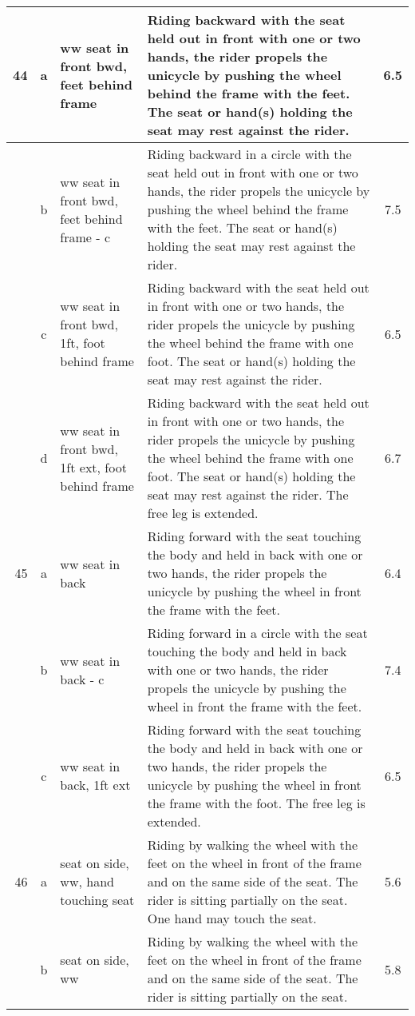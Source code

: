 \begin{longtable}{|r|c|p{4cm}|p{8cm}|c|}
\hline
44  & a & ww seat in front bwd, feet behind frame & Riding backward with the seat held out in front with one or two hands, the rider propels the unicycle by pushing the wheel behind the frame with the feet. The seat or hand(s) holding the seat may rest against the rider. & 6.5 \\ 
\hline
  & b & ww seat in front bwd, feet behind frame - c & Riding backward in a circle with the seat held out in front with one or two hands, the rider propels the unicycle by pushing the wheel behind the frame with the feet. The seat or hand(s) holding the seat may rest against the rider. & 7.5 \\ 
\hline
  & c & ww seat in front bwd, 1ft, foot behind frame  & Riding backward with the seat held out in front with one or two hands, the rider propels the unicycle by pushing the wheel behind the frame with one foot. The seat or hand(s) holding the seat may rest against the rider. & 6.5 \\ 
\hline
  & d & ww seat in front bwd, 1ft ext, foot behind frame  & Riding backward with the seat held out in front with one or two hands, the rider propels the unicycle by pushing the wheel behind the frame with one foot. The seat or hand(s) holding the seat may rest against the rider. The free leg is extended. & 6.7 \\ 
\hline
45  & a & ww seat in back & Riding forward with the seat touching the body and held in back with one or two hands, the rider propels the unicycle by pushing the wheel in front the frame with the feet.  & 6.4 \\ 
\hline
  & b & ww seat in back - c & Riding forward in a circle with the seat touching the body and held in back with one or two hands, the rider propels the unicycle by pushing the wheel in front the frame with the feet.  & 7.4 \\ 
\hline
  & c & ww seat in back, 1ft ext  & Riding forward with the seat touching the body and held in back with one or two hands, the rider propels the unicycle by pushing the wheel in front the frame with the foot. The free leg is extended.  & 6.5 \\ 
\hline
46  & a & seat on side, ww, hand touching seat  & Riding by walking the wheel with the feet on the wheel in front of the frame and on the same side of the seat. The rider is sitting partially on the seat. One hand may touch the seat. & 5.6 \\ 
\hline
  & b & seat on side, ww  & Riding by walking the wheel with the feet on the wheel in front of the frame and on the same side of the seat. The rider is sitting partially on the seat.  & 5.8 \\ 

\end{longtable}
